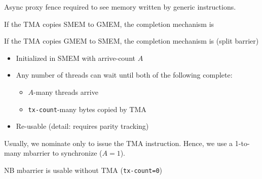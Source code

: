 \begin{minipage}[t]{0.48\textwidth}\fixminipage
{}

Async proxy fence required to see memory written by generic instructions.


If the TMA copies SMEM to GMEM, the completion mechanism is 

If the TMA copies GMEM to SMEM, the completion mechanism is  (split barrier)

\begin{itemize}
  \item Initialized in SMEM with arrive-count $A$
  \item Any number of threads can wait until both of the following complete:
  \begin{itemize}
    \item $A$-many threads arrive
    \item \texttt{tx-count}-many bytes copied by TMA
  \end{itemize}
  \item Re-usable (detail: requires parity tracking)
\end{itemize}
Usually, we nominate only  to issue the TMA instruction.
Hence, we use a 1-to-many mbarrier to synchronize ($A = 1$).

NB mbarrier is usable without TMA (\texttt{tx-count=0})

\end{minipage}
\newpage
{}

